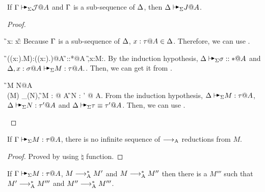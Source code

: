 
\begin{lemma}
    \label{lemma:AlgorithmicWeakening}
    If \(\G \AVS \mathcal{J}@A\) and \(\Gamma\) is a sub-sequence of \(\Delta\), then \(\D \AVS J@A\).
\end{lemma}

\begin{proof}
    \begin{rneqncase}{\TAVar}{
        \G \AVS x:\tau@A
        x:\tau@A \in \G
        }
        Because \( \Gamma \) is a sub-sequence of \( \Delta \), \( x:\tau@A \in \D \).
        Therefore, we can use \TAVar.
    \end{rneqncase}
    \begin{rneqncase}{\TAAbs}{
            \G\AVS(\lambda (x:\sigma).M):(\Pi (x:\sigma).\tau)@A
            \G\AVS \sigma::*@A 
            \G,x:\sigma@A\AVS M:\tau@A.
        }
        By the induction hypothesis, \( \D \AVS \sigma::*@A \) and \(
        \D,x:\sigma@A\AVS M:\tau@A. \). Then, we can get it from \TAAbs.
    \end{rneqncase}
    \begin{rneqncase}{\QAANF}{
            \G \AVS M \E N@A
             \\
            \ANF(M) \E_\alpha \ANF(N),
            \G \AVS M : \tau @ A 
            \G \AVS N : \tau' @ A.
        }
        From the induction hypothesis, \( \D \AVS M : \tau @ A \), \( \D \AVS N
        : \tau' @ A \) and \( \D \AVS \tau \E \tau' @ A \). Then, we can use \QAANF.
    \end{rneqncase}
\end{proof}

\begin{lemma}
    \label{lemma:StrongNormalizationofAlgorithmicReduction}
    If \( \G \AVS M :\tau @ A\), there is no infinite sequence of \( \longrightarrow_{\text{A}} \) reductions from \( M \).
\end{lemma}

\begin{proof}
    Proved by using \( \natural \) function.
\end{proof}

\begin{lemma}
    \label{lemma:ConfluenceofAlgorithmicReduction}
    If \( \G \AVS M :\tau @ A\), \( M \longrightarrow_{\text{A}}^* M' \) and \(M \longrightarrow_{\text{A}}^* M''\)
    then there is a \( M''' \) such that \( M' \longrightarrow_{\text{A}}^* M''' \) and \( M'' \longrightarrow_{\text{A}}^* M''' \).
\end{lemma}

